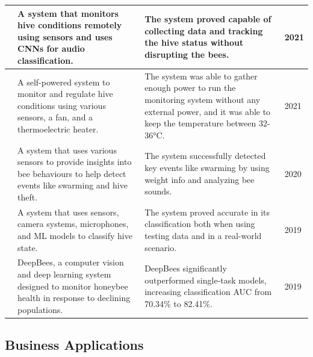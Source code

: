\documentclass[12pt]{article}
\begin{document}
\begin{table}[H]
{\begin{tabular}{|>{\centering\arraybackslash}m{1.5 cm}|m{6 cm}|m{6 cm}| m{1 cm}|}
				
					{\cite{tashakkori2021beemon}} & A system that monitors hive conditions remotely using sensors and uses CNNs for audio classification. & The system proved capable of collecting data and tracking the hive status without disrupting the bees. & 2021 \\ \hline
			
				
					{\cite{ntawuzumunsi2021self}} & A self-powered system to monitor and regulate hive conditions using various sensors, a fan, and a thermoelectric heater. & The system was able to gather enough power to run the monitoring system without any external power, and it was able to keep the temperature between 32-36°C. & 2021 \\ \hline
			
				
					{\cite{cecchi2020smart}} & A system that uses various sensors to provide insights into bee behaviours to help detect events like swarming and hive theft. & The system successfully detected key events like swarming by using weight info and analyzing bee sounds. & 2020 \\ \hline
			
				
					{\cite{konig2019indusbee}} & A system that uses sensors, camera systems, microphones, and ML models to classify hive state. & The system proved accurate in its classification both when using testing data and in a real-world scenario. & 2019 \\ \hline
			
				
					{\cite{marstaller2019deepbees}} & DeepBees, a computer vision and deep learning system designed to monitor honeybee health in response to declining populations. & DeepBees significantly outperformed single-task models, increasing classification AUC from 70.34\% to 82.41\%. & 2019 \\ \hline
			
				
			\end{tabular}%
		}
		\label{tab:SUMMARY}
	\end{table}
	\subsection{Business Applications}
	
\end{document}
